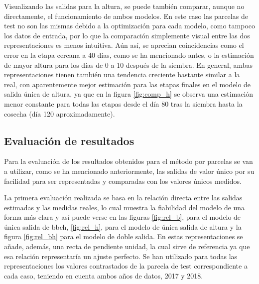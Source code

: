 \par Visualizando las salidas para la altura, se puede también comparar, aunque no directamente, el funcionamiento de ambos modelos. En este caso las parcelas de test no son las mismas debido a la optimización para cada modelo, como tampoco los datos de entrada, por lo que la comparación simplemente visual entre las dos representaciones es menos intuitiva. Aún así, se aprecian coincidencias como el error en la etapa cercana a 40 días, como se ha mencionado antes, o la estimación de mayor altura para los días de 0 a 10 después de la siembra. En general, ambas representaciones tienen también una tendencia creciente bastante similar a la real, con aparentemente mejor estimación para las etapas finales en el modelo de salida única de altura, ya que en la figura \ref{fig:comp_h} se observa una estimación menor constante para todas las etapas desde el día 80 tras la siembra hasta la cosecha (día 120 aproximadamente).

\subsection{Evaluación de resultados}
\par Para la evaluación de los resultados obtenidos para el método por parcelas se van a utilizar, como se ha mencionado anteriormente, las salidas de valor único por su facilidad para ser representadas y comparadas con los valores únicos medidos. 
\\
\par La primera evaluación realizada se basa en la relación directa entre las salidas estimadas y las medidas reales, lo cual muestra la fiabilidad del modelo de una forma más clara y así puede verse en las figuras \ref{fig:rel_b}, para el modelo de única salida de \gls{bbch}, \ref{fig:rel_h}, para el modelo de única salida de altura y la figura \ref{fig:rel_bh} para el modelo de doble salida. En estas representaciones se añade, además, una recta de pendiente unidad, la cual sirve de referencia ya que esa relación representaría un ajuste perfecto. Se han utilizado para todas las representaciones los valores contrastados de la parcela de test correspondiente a cada caso, teniendo en cuenta ambos años de datos, 2017 y 2018.

